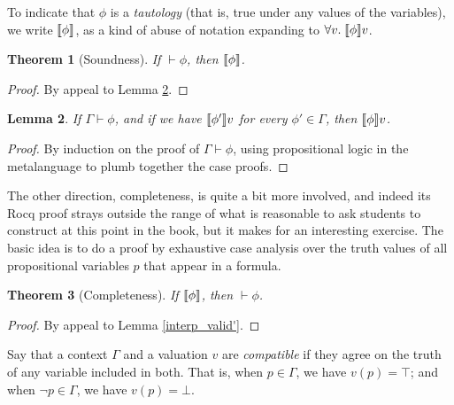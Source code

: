 \documentclass{amsbook}
\newtheorem{theorem}{Theorem}[chapter]
\newtheorem{lemma}[theorem]{Lemma}
\theoremstyle{definition}
\theoremstyle{remark}
\numberwithin{section}{chapter}
\numberwithin{equation}{chapter}
\begin{document}
To indicate that $\phi$ is a \emph{tautology} (that is, true under any values of the variables), we write ${\left \llbracket \phi \right \rrbracket}$, as a kind of abuse of notation expanding to $\forall v. \; {\left \llbracket \phi \right \rrbracket}v$.

\begin{theorem}[Soundness]
  If $\vdash \phi$, then ${\left \llbracket \phi \right \rrbracket}$.
\end{theorem}
\begin{proof}
  By appeal to Lemma \ref{valid_interp'}.
\end{proof}

\begin{lemma}\label{valid_interp'}
  If $\Gamma \vdash \phi$, and if we have ${\left \llbracket \phi' \right \rrbracket}v$ for every $\phi' \in \Gamma$, then ${\left \llbracket \phi \right \rrbracket}v$.
\end{lemma}
\begin{proof}
  By induction on the proof of $\Gamma \vdash \phi$, using propositional logic in the metalanguage to plumb together the case proofs.
\end{proof}

The other direction, completeness, is quite a bit more involved, and indeed its Rocq proof strays outside the range of what is reasonable to ask students to construct at this point in the book, but it makes for an interesting exercise.
The basic idea is to do a proof by exhaustive case analysis over the truth values of all propositional variables $p$ that appear in a formula.

\begin{theorem}[Completeness]
  If ${\left \llbracket \phi \right \rrbracket}$, then $\vdash \phi$.
\end{theorem}
\begin{proof}
  By appeal to Lemma \ref{interp_valid'}.
\end{proof}

Say that a context $\Gamma$ and a valuation $v$ are \emph{compatible} if they agree on the truth of any variable included in both.
That is, when $p \in \Gamma$, we have $v(p) = \top$; and when $\neg p \in \Gamma$, we have $v(p) = \bot$.
\end{document}
